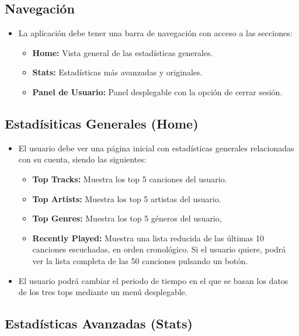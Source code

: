 \subsection{Navegación}
\begin{itemize}
    \item La aplicación debe tener una barra de navegación con acceso a las secciones:
          \begin{itemize}
              \item \textbf{Home:} Vista general de las estadísticas generales.
              \item \textbf{Stats:} Estadísticas más avanzadas y originales.
              \item \textbf{Panel de Usuario:} Panel desplegable con la opción de cerrar sesión. %
          \end{itemize}
\end{itemize}

\subsection{Estadísiticas Generales (Home)}
\begin{itemize}
    \item El usuario debe ver una página inicial con estadísticas generales relacionadas con su cuenta, siendo las siguientes:
          \begin{itemize}
              \item \textbf{Top Tracks:} Muestra los top 5 canciones del usuario.
              \item \textbf{Top Artists:} Muestra los top 5 artistas del usuario.
              \item \textbf{Top Genres:} Muestra los top 5 géneros del usuario,
              \item \textbf{Recently Played:} Muestra una lista reducida de las últimas 10 canciones escuchadas, en orden cronológico. Si el usuario quiere, podrá ver la lista completa de las 50 canciones pulsando un botón.
          \end{itemize}
    \item El usuario podrá cambiar el periodo de tiempo en el que se basan los datos de los tres tops mediante un menú desplegable.
\end{itemize}

\subsection{Estadísticas Avanzadas (Stats)}

